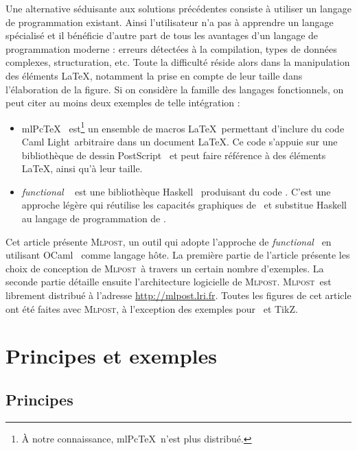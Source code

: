 \documentclass[twoside]{studia-Hermann}
\newcommand{\ocaml}{OCaml}
\newcommand{\camllight}{Caml Light}
\newcommand{\mlpost}{\textsc{Mlpost}}
\newcommand{\metapost}{\MP}
\newcommand{\fmpost}{\textit{functional} \metapost}
\newcommand{\nomdetikz}{\textsf{TikZ}}
\newcommand{\postscript}{PostScript}
\newcommand{\mlpictex}{mlP\hspace{-0.2em}\raisebox{-0.2em}{i}\hspace{-0.1em}c\hspace{-0.1em}\TeX}
\begin{document}
Une alternative séduisante aux solutions précédentes consiste à
utiliser un langage de programmation existant. Ainsi l'utilisateur n'a
pas à apprendre un langage spécialisé et il bénéficie d'autre part de
tous les avantages d'un langage de programmation moderne : erreurs
détectées à la compilation, types de données complexes, structuration, etc.
Toute la difficulté réside alors dans la manipulation des éléments
\LaTeX, notamment la prise en compte de leur taille dans l'élaboration
de la figure. Si on considère la famille des langages fonctionnels, on
peut citer au moins deux exemples de telle intégration :
\begin{itemize}
\item \mlpictex~\cite{mlpictex} est\footnote{À notre connaissance,
    \mlpictex\ n'est plus distribué.} un ensemble de macros \LaTeX\ permettant
  d'inclure du code \camllight\ arbitraire dans un document \LaTeX.
  Ce code s'appuie sur une bibliothèque de dessin
  \postscript~\cite{postscript} et peut 
  faire référence à des éléments \LaTeX, ainsi qu'à leur taille.

\item \fmpost~\cite{fmpost} est une bibliothèque
  Haskell~\cite{haskell} produisant du 
  code \metapost. C'est une approche légère qui réutilise les
  capacités graphiques de \metapost\ et substitue Haskell au langage
  de programmation de \metapost.
\end{itemize}

Cet article présente \mlpost, un outil qui adopte l'approche de
\fmpost\ en utilisant \ocaml~\cite{ocaml} comme langage hôte. La
première partie 
de l'article présente les choix de conception de \mlpost\ à travers un
certain nombre d'exemples. La seconde partie détaille ensuite
l'architecture logicielle de \mlpost.
\mlpost\ est librement distribué à l'adresse
\url{http://mlpost.lri.fr}. 
Toutes les figures de cet article ont été faites avec \mlpost, à
l'exception des exemples pour \metapost\ et \nomdetikz.




\section{Principes et exemples}\label{exemples}

\subsection{Principes}
\end{document}
